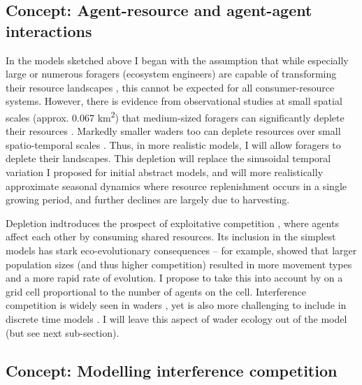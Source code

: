 \subsection{Concept: Agent-resource and agent-agent interactions}

In the models sketched above I began with the assumption that while
especially large or numerous foragers (ecosystem engineers) are capable
of transforming their resource landscapes
\citep{laundre2001, jefferies2006, leroux2018}, this cannot be expected
for all consumer-resource systems. However, there is evidence from
observational studies at small spatial scales (approx. 0.067
km\textsuperscript{2}) that medium-sized foragers can significantly
deplete their resources \citep{guillemette1996, jefferies2006}. Markedly
smaller waders too can deplete resources over small spatio-temporal
scales \citep{szekely1992, vangils2003, bijleveld2015}. Thus, in more
realistic models, I will allow foragers to deplete their landscapes.
This depletion will replace the sinusoidal temporal variation I proposed
for initial abstract models, and will more realistically approximate
seasonal dynamics where resource replenishment occurs in a single
growing period, and further declines are largely due to harvesting.

Depletion indtroduces the prospect of exploitative competition
\citep{keddy2001}, where agents affect each other by consuming shared
resources. Its inclusion in the simplest models has stark
eco-evolutionary consequences -- for example, \citet{getz2015} showed
that larger population sizes (and thus higher competition) resulted in
more movement types and a more rapid rate of evolution. I propose to
take this into account by on a grid cell proportional to the number of
agents on the cell. Interference competition is widely seen in waders
\citep{goss-custard1980}, yet is also more challenging to include in
discrete time models \citep{vahl2006}. I will leave this aspect of wader
ecology out of the model (but see next sub-section).

\subsection{Concept: Modelling interference competition}

